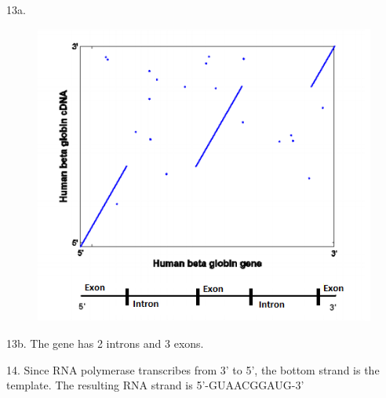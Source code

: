 \documentclass{article}
\begin{document}
13a. \begin{figure}[h]
  \centering
 \includegraphics[scale=0.7]{P13.png}
\end{figure}

13b. The gene has 2 introns and 3 exons.
\vspace{5mm}

14. Since RNA polymerase transcribes from 3' to 5', the bottom strand is the template. The resulting RNA strand is 5'-GUAACGGAUG-3'
\end{document}
